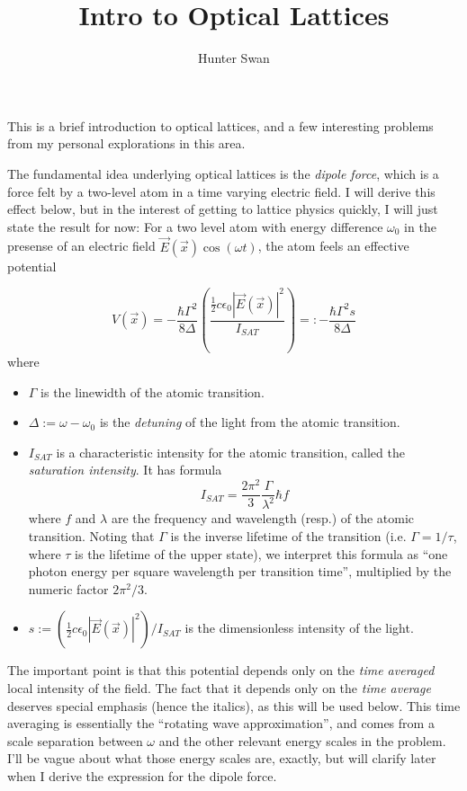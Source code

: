 \documentclass[aps,prb,floatfix,amsmath,amssymb,groupedaddress]{revtex4}
\begin{document}
\providecommand{\half}{{\frac{1}{2}}}		%

\title{Intro to Optical Lattices}

\author{Hunter Swan}

\maketitle

This is a brief introduction to optical lattices, and a few interesting problems from my personal explorations in this area.

The fundamental idea underlying optical lattices is the \textit{dipole force}, which is a force felt by a two-level atom in a time varying electric field.  I will derive this effect below, but in the interest of getting to lattice physics quickly, I will just state the result for now:  For a two level atom with energy difference $\omega_0$ in the presense of an electric field $\vec{E}(\vec{x})\cos(\omega t)$, the atom feels an effective potential 

\begin{equation} %
V(\vec{x}) = -\frac{\hbar \Gamma^2}{8\Delta} \left(\frac{\half c \epsilon_0 \left|\vec{E}(\vec{x})\right|^2}{I_{SAT}}\right) =: -\frac{\hbar\Gamma^2 s}{8\Delta}
\label{dipoleForce}
\end{equation}
where
\begin{itemize}
\item $\Gamma$ is the linewidth of the atomic transition.
\item $\Delta:= \omega-\omega_0$ is the \textit{detuning} of the light from the atomic transition. 
\item $I_{SAT}$ is a characteristic intensity for the atomic transition, called the \textit{saturation intensity}.  It has formula $$I_{SAT} = \frac{2\pi^2}{3} \frac{\Gamma}{\lambda^2} \hbar f$$ where $f$ and $\lambda$ are the frequency and wavelength (resp.) of the atomic transition.  Noting that $\Gamma$ is the inverse lifetime of the transition (i.e. $\Gamma = 1/\tau$, where $\tau$ is the lifetime of the upper state), we interpret this formula as ``one photon energy per square wavelength per transition time'', multiplied by the numeric factor $2\pi^2/3$.
\item $s:= \left(\half c \epsilon_0 \left|\vec{E}(\vec{x})\right|^2\right)/I_{SAT} $ is the dimensionless intensity of the light. 
\end{itemize}
The important point is that this potential depends only on the \textit{time averaged} local intensity of the field.  The fact that it depends only on the \textit{time average} deserves special emphasis (hence the italics), as this will be used below.  This time averaging is essentially the ``rotating wave approximation'', and comes from a scale separation between $\omega$ and the other relevant energy scales in the problem.  I'll be vague about what those energy scales are, exactly, but will clarify later when I derive the expression for the dipole force.  
\end{document}
